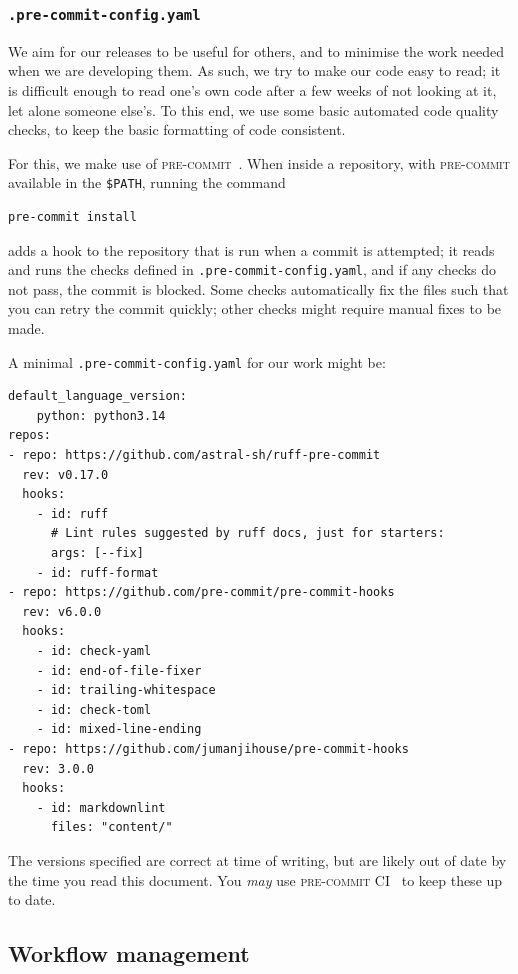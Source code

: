 \documentclass{article}
\newcommand\rfcword[1]{\emph{#1}\xspace}
\newcommand\may{\rfcword{may}}
\newcommand\filename[1]{\texttt{#1}\xspace}
\newcommand\program[1]{\textsc{#1}\xspace}
\begin{document}
\subsubsection{\filename{.pre-commit-config.yaml}}

We aim for our releases to be useful for others,
and to minimise the work needed when we are developing them.
As such,
we try to make our code easy to read;
it is difficult enough to read one's own code
after a few weeks of not looking at it,
let alone someone else's.
To this end,
we use some basic automated code quality checks,
to keep the basic formatting of code consistent.

For this,
we make use of \program{pre-commit}~\cite{pre-commit}.
When inside a repository,
with \program{pre-commit} available in the \texttt{\$PATH},
running the command
\begin{verbatim}
pre-commit install
\end{verbatim}
adds a hook to the repository that is run when a commit is attempted;
it reads and runs the checks defined in \filename{.pre-commit-config.yaml},
and if any checks do not pass,
the commit is blocked.
Some checks automatically fix the files such that you can retry the commit quickly;
other checks might require manual fixes to be made.

A minimal \filename{.pre-commit-config.yaml} for our work might be:

\begin{verbatim}
default_language_version:
    python: python3.14
repos:
- repo: https://github.com/astral-sh/ruff-pre-commit
  rev: v0.17.0
  hooks:
    - id: ruff
      # Lint rules suggested by ruff docs, just for starters:
      args: [--fix]
    - id: ruff-format
- repo: https://github.com/pre-commit/pre-commit-hooks
  rev: v6.0.0
  hooks:
    - id: check-yaml
    - id: end-of-file-fixer
    - id: trailing-whitespace
    - id: check-toml
    - id: mixed-line-ending
- repo: https://github.com/jumanjihouse/pre-commit-hooks
  rev: 3.0.0
  hooks:
    - id: markdownlint
      files: "content/"
\end{verbatim}

The versions specified are correct at time of writing,
but are likely out of date by the time you read this document.
You \may use \program{pre-commit CI}~\cite{pre-commit-ci} to keep these up to date.

\subsection{Workflow management}\label{sec:wf-manager}
\end{document}
